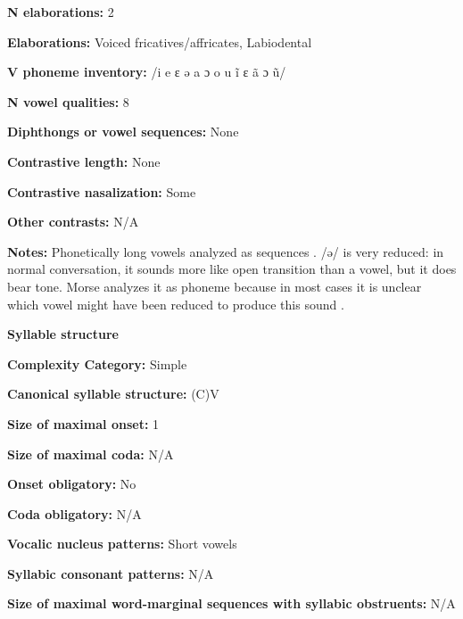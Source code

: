 \textbf{N elaborations:} 2



\textbf{Elaborations:} Voiced fricatives/affricates, Labiodental



\textbf{V phoneme inventory:} /i e ɛ ə a ɔ o u ĩ ɛ ã ɔ ũ/



\textbf{N vowel qualities:} 8



\textbf{Diphthongs or vowel sequences:} None



\textbf{Contrastive length:} None



\textbf{Contrastive nasalization:} Some



\textbf{Other contrasts:} N/A



\textbf{Notes:} Phonetically long vowels analyzed as sequences \citep[100-105]{Morse1976}. /ə/ is very reduced: in normal conversation, it sounds more like open transition than a vowel, but it does bear tone. Morse analyzes it as phoneme because in most cases it is unclear which vowel might have been reduced to produce this sound \citep[42-5]{Morse1976}.



\textbf{Syllable structure}



\textbf{Complexity Category:} Simple



\textbf{Canonical syllable structure:} (C)V \citep[112-114]{Morse1976}



\textbf{Size of maximal onset:} 1



\textbf{Size of maximal coda:} N/A



\textbf{Onset obligatory:} No



\textbf{Coda obligatory:} N/A



\textbf{Vocalic nucleus patterns:} Short vowels



\textbf{Syllabic consonant patterns:} N/A



\textbf{Size of maximal word{}-marginal sequences with syllabic obstruents:} N/A



